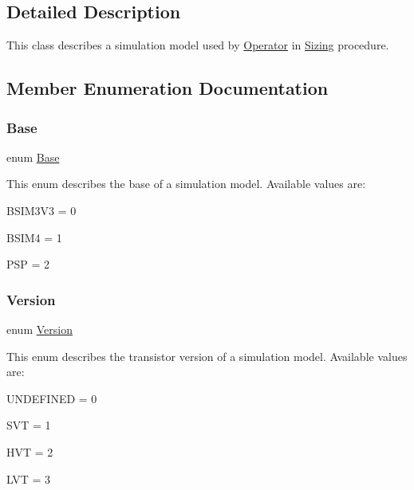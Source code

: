 \subsection{Detailed Description}
This class describes a simulation model used by \hyperlink{class_open_chams_1_1_operator}{Operator} in \hyperlink{class_open_chams_1_1_sizing}{Sizing} procedure. 

\subsection{Member Enumeration Documentation}
\mbox{\label{class_open_chams_1_1_simul_model_a450696a95d6cb29d7723838846948340}} 
\subsubsection{\texorpdfstring{Base}{Base}}
{\footnotesize\ttfamily enum \hyperlink{class_open_chams_1_1_simul_model_a450696a95d6cb29d7723838846948340}{Base}}

This enum describes the base of a simulation model. Available values are\+:
\begin{DoxyItemize}
\item B\+S\+I\+M3\+V3 = 0
\item B\+S\+I\+M4 = 1
\item P\+SP = 2 
\end{DoxyItemize}\mbox{\label{class_open_chams_1_1_simul_model_a2256f5bba1c1c69a92b933aa501df470}} 
\subsubsection{\texorpdfstring{Version}{Version}}
{\footnotesize\ttfamily enum \hyperlink{class_open_chams_1_1_simul_model_a2256f5bba1c1c69a92b933aa501df470}{Version}}

This enum describes the transistor version of a simulation model. Available values are\+:
\begin{DoxyItemize}
\item U\+N\+D\+E\+F\+I\+N\+ED = 0
\item S\+VT = 1
\item H\+VT = 2
\item L\+VT = 3 
\end{DoxyItemize}

